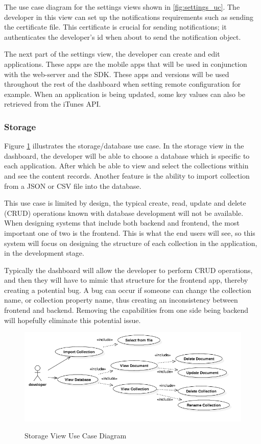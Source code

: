 The use case diagram for the settings views shown in \ref{fig:settings_uc}. The developer in this view can set up the notifications requirements such as sending the certificate file. This certificate is crucial for sending notifications; it authenticates the developer's id when about to send the notification object.

The next part of the settings view, the developer can create and edit applications. These apps are the mobile apps that will be used in conjunction with the web-server and the SDK. These apps and versions will be used throughout the rest of the dashboard when setting remote configuration for example. When an application is being updated, some key values can also be retrieved from the iTunes API.

\subsubsection{Storage} \label{d-db:storage}

Figure \ref{fig:storage_use_case} illustrates the storage/database use case. In the storage view in the dashboard, the developer will be able to choose a database which is specific to each application. After which be able to view and select the collections within and see the content records. Another feature is the ability to import collection from a JSON or CSV file into the database.

This use case is limited by design, the typical create, read, update and delete (CRUD) operations known with database development will not be available. When designing systems that include both backend and frontend, the most important one of two is the frontend. This is what the end users will see, so this system will focus on designing the structure of each collection in the application, in the development stage. 

Typically the dashboard will allow the developer to perform CRUD operations, and then they will have to mimic that structure for the frontend app, thereby creating a potential bug. A bug can occur if someone can change the collection name, or collection property name, thus creating an inconsistency between frontend and backend. Removing the capabilities from one side being backend will hopefully eliminate this potential issue.

\begin{figure}[!h]
    \caption{Storage View Use Case Diagram}
    \centering
    \includegraphics[width=120mm]{images/use_cases/storage_use_case}
    \label{fig:storage_use_case}
\end{figure}

